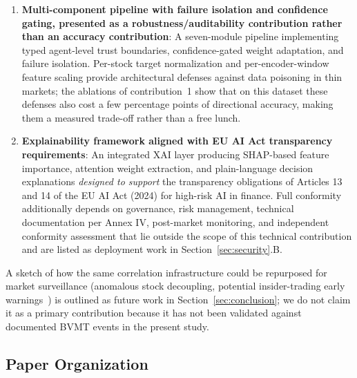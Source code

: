 \documentclass[conference]{IEEEtran}
\begin{document}
\begin{enumerate}
\item \textbf{Multi-component pipeline with failure isolation and confidence gating, presented as a robustness/auditability contribution rather than an accuracy contribution}: A seven-module pipeline implementing typed agent-level trust boundaries, confidence-gated weight adaptation, and failure isolation. Per-stock target normalization and per-encoder-window feature scaling provide architectural defenses against data poisoning in thin markets; the ablations of contribution~1 show that on this dataset these defenses also cost a few percentage points of directional accuracy, making them a measured trade-off rather than a free lunch.

\item \textbf{Explainability framework aligned with EU AI Act transparency requirements}: An integrated XAI layer producing SHAP-based feature importance, attention weight extraction, and plain-language decision explanations \emph{designed to support} the transparency obligations of Articles 13 and 14 of the EU AI Act (2024) for high-risk AI in finance. Full conformity additionally depends on governance, risk management, technical documentation per Annex IV, post-market monitoring, and independent conformity assessment that lie outside the scope of this technical contribution and are listed as deployment work in Section~\ref{sec:security}.B.

\end{enumerate}

A sketch of how the same correlation infrastructure could be repurposed for market surveillance (anomalous stock decoupling, potential insider-trading early warnings~\cite{ref:market_surveillance}) is outlined as future work in Section~\ref{sec:conclusion}; we do not claim it as a primary contribution because it has not been validated against documented BVMT events in the present study.

\subsection{Paper Organization}
\end{document}
